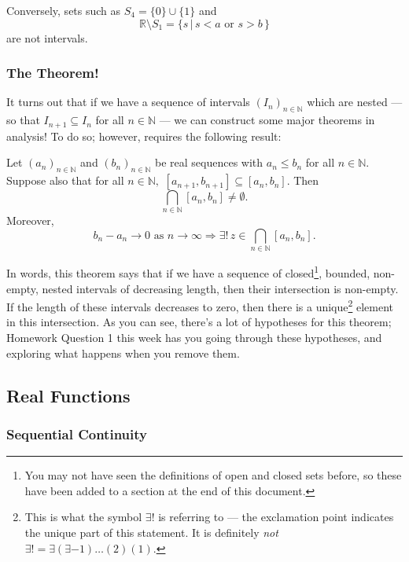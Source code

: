 \documentclass[
  12pt,
  a4paper]{extarticle}
\theoremstyle{plain}
\theoremstyle{plain}
\theoremstyle{plain}
\theoremstyle{plain}
\theoremstyle{plain}
\theoremstyle{definition}
\theoremstyle{definition}
\theoremstyle{definition}
\theoremstyle{remark}
\let\BeginKnitrBlock\begin \let\EndKnitrBlock\end
\renewcommand{\;}{\,}
\begin{document}
Conversely, sets such as \(S_4 = \lbrace 0 \rbrace \cup \lbrace 1 \rbrace\) and \[\mathbb{R}\setminus S_1 = \lbrace s \;\lvert\; s < a \;\; \text{or}\;\; s > b\;\rbrace\] are not intervals.

\hypertarget{the-theorem}{%
\subsubsection{The Theorem!}\label{the-theorem}}

It turns out that if we have a sequence of intervals \((I_n)_{n\in\mathbb{N}}\) which are nested --- so that \(I_{n+1} \subseteq I_n\) for all \(n\in\mathbb{N}\) --- we can construct some major theorems in analysis! To do so; however, requires the following result:

\BeginKnitrBlock{theorem}[Nested Intervals Theorem]
{\label{thm:thm1} }Let \((a_n)_{n\in\mathbb{N}}\) and \((b_n)_{n\in\mathbb{N}}\) be real sequences with \(a_n \leq b_n\) for all \(n\in\mathbb{N}\). Suppose also that for all \(n\in\mathbb{N},\) \([a_{n+1},b_{n+1}] \subseteq [a_{n},b_{n}]\). Then \[\bigcap_{n\in\mathbb{N}}[a_n,b_n] \neq \emptyset.\] Moreover, \[b_n - a_n \to 0 \;\;\text{as $n \to \infty$} \Longrightarrow \exists!\; z \in \bigcap_{n\in\mathbb{N}}[a_n,b_n].\]
\EndKnitrBlock{theorem}
In words, this theorem says that if we have a sequence of closed\footnote{You may not have seen the definitions of open and closed sets before, so these have been added to a section at the end of this document.}, bounded, non-empty, nested intervals of decreasing length, then their intersection is non-empty. If the length of these intervals decreases to zero, then there is a unique\footnote{This is what the symbol \(\exists!\) is referring to --- the exclamation point indicates the unique part of this statement. It is definitely \emph{not} \(\exists! = \exists(\exists-1)\ldots(2)(1).\)} element in this intersection. As you can see, there's a lot of hypotheses for this theorem; Homework Question 1 this week has you going through these hypotheses, and exploring what happens when you remove them.

\hypertarget{sec1}{%
\subsection{Real Functions}\label{sec1}}

\hypertarget{sequential-continuity}{%
\subsubsection{Sequential Continuity}\label{sequential-continuity}}
\end{document}
